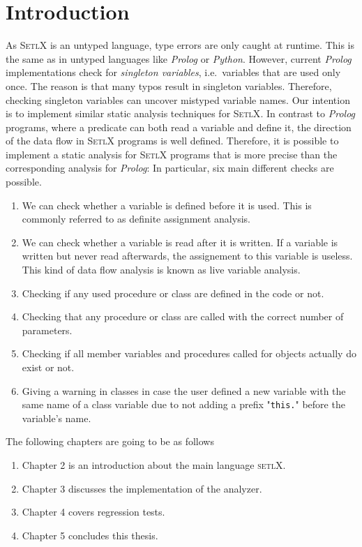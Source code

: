 \documentclass[11pt]{report}
\begin{document}
\tableofcontents

\chapter{Introduction}
As \textsc{SetlX} is an untyped language, type errors are only caught at runtime.  This is the same
as in untyped languages like \textsl{Prolog}\cite{bratko:90} or \textsl{Python}\cite{vanRossum:95}.  However, current \textsl{Prolog}
implementations check for \emph{singleton variables}, i.e.~variables that are used only once.  The
reason is that many typos result in singleton variables.  Therefore, checking singleton variables
can uncover mistyped variable names.  Our intention 
is to implement similar static analysis techniques for \textsc{SetlX}.  In contrast to
\textsl{Prolog} programs, where a predicate can both read a variable and define it, the direction of
the data flow in \textsc{SetlX} programs is well defined.  Therefore, it is possible to implement a
static analysis for \textsc{SetlX} programs that is more precise than the corresponding analysis for
\textsl{Prolog}:  In particular, six main different checks are possible.

\begin{enumerate}
\item We can check whether a variable is defined before it is used.
      This is commonly referred to as definite assignment analysis\cite{definiteAssignmentAnalysis:Online}.
\item We can check whether a variable is read after it is written.  If a variable is written but
      never read afterwards, the assignement to this variable is useless.  This kind of data flow
      analysis is known as live variable analysis\cite{liveVariableAnalysis:Online}.
\item Checking if any used procedure or class are defined in the code or not.
\item Checking that any procedure or class are called with the correct number of parameters.
\item Checking if all member variables and procedures called for objects actually do exist or not.
\item Giving a warning in classes in case the user defined a new variable with the same name of a class variable due to not adding a prefix "\texttt{this.}" before the variable's name.
\end{enumerate}

The following chapters are going to be as follows
\begin{enumerate}
\item Chapter 2 is an introduction about the main language \textsc{setlX}.
\item Chapter 3 discusses the implementation of the analyzer.
\item Chapter 4 covers regression tests.
\item Chapter 5 concludes this thesis.
\end{enumerate}
\end{document}
